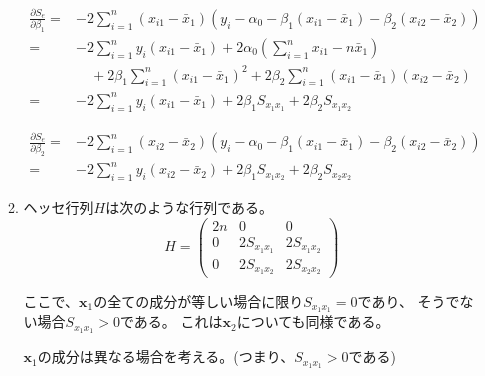 \documentclass[12pt,b5paper]{ltjsarticle}
\begin{document}
\begin{enumerate}
\begin{enumerate}
            \begin{align}
             \frac{\partial S_e}{\partial \beta_1}
             =& -2\sum_{i=1}^{n}(x_{i1}-\bar{x}_1)
             ( y_i - \alpha_0 - \beta_1 (x_{i1}-\bar{x}_1) - \beta_2 (x_{i2}-\bar{x}_2) )\\
             =& -2\sum_{i=1}^{n}y_i(x_{i1}-\bar{x}_1)
             + 2\alpha_0\left( \sum_{i=1}^{n}x_{i1}-n\bar{x}_1 \right)\\
             & \quad
             + 2\beta_1 \sum_{i=1}^{n}\left( x_{i1}-\bar{x}_1 \right)^2
             + 2\beta_2 \sum_{i=1}^{n}\left( x_{i1}-\bar{x}_1 \right)\left( x_{i2}-\bar{x}_2 \right) \\
             =& -2\sum_{i=1}^{n}y_i(x_{i1}-\bar{x}_1)+ 2\beta_1 S_{x_1x_1}+ 2\beta_2 S_{x_1x_2}
            \end{align}

            \begin{align}
             \frac{\partial S_e}{\partial \beta_2}
             =& -2\sum_{i=1}^{n}(x_{i2}-\bar{x}_2)
             ( y_i - \alpha_0 - \beta_1 (x_{i1}-\bar{x}_1) - \beta_2 (x_{i2}-\bar{x}_2) )\\
             =& -2\sum_{i=1}^{n}y_i(x_{i2}-\bar{x}_2)+ 2\beta_1 S_{x_1x_2}+ 2\beta_2 S_{x_2x_2}
            \end{align}


       \item
            ヘッセ行列$H$は次のような行列である。
            \begin{equation}
             H=
              \begin{pmatrix}
               2n & 0 & 0\\
               0
               & 2 S_{x_1x_1}%
               & 2 S_{x_1x_2}\\%
               0
               & 2 S_{x_1x_2}%
               & 2 S_{x_2x_2}%
              \end{pmatrix}
            \end{equation}

            ここで、$\bm{x}_1$の全ての成分が等しい場合に限り$S_{x_1x_1}=0$であり、
            そうでない場合$S_{x_1x_1}>0$である。
            これは$\bm{x}_2$についても同様である。

            $\bm{x}_1$の成分は異なる場合を考える。(つまり、$S_{x_1x_1}>0$である)


\end{enumerate}
\end{enumerate}
\end{document}

